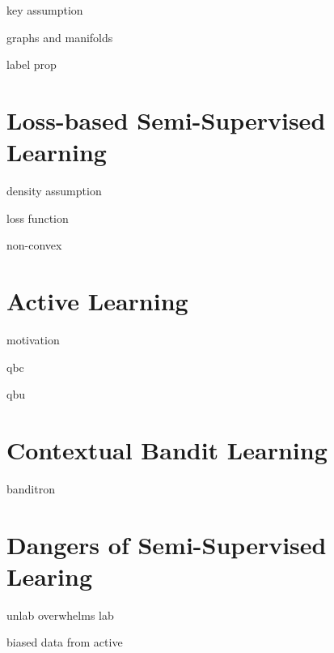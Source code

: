key assumption

graphs and manifolds

label prop

\section{Loss-based Semi-Supervised Learning}

density assumption

loss function

non-convex

\section{Active Learning}

motivation

qbc

qbu

\section{Contextual Bandit Learning}

banditron

\section{Dangers of Semi-Supervised Learing}

unlab overwhelms lab

biased data from active



